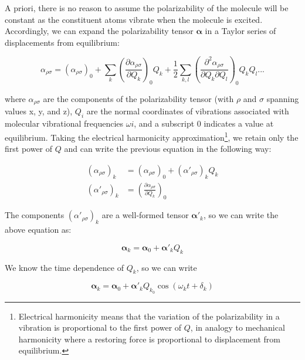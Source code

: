 A priori, there is no reason to assume the polarizability of the molecule will be constant as the constituent atoms vibrate when the molecule is excited. Accordingly, we can expand the polarizability tensor $\boldsymbol{\alpha}$ in a Taylor series of displacements from equilibrium:

\begin{equation}
\alpha_{\rho \sigma} = (\alpha_{\rho \sigma})_{0} + \sum_{k} \left( \frac{\partial \alpha_{\rho \sigma}}{\partial Q_{k}} \right)_{0} Q_{k} + \frac{1}{2} \sum_{k,l} \left( \frac{\partial^{2} \alpha_{\rho \sigma}}{\partial Q_{k} \partial Q_{l}} \right)_{0} Q_{k} Q_{l} ...
\end{equation}

where $\alpha_{\rho \sigma}$ are the components of the polarizability tensor (with $\rho$ and $\sigma$ spanning values x, y, and z), $Q_{i}$ are the normal coordinates of vibrations associated with molecular vibrational frequencies $\omega{i}$, and a subscript 0 indicates a value at equilibrium. Taking the electrical harmonicity approximation\footnote{Electrical harmonicity means that the variation of the polarizability in a vibration is proportional to the first power of $Q$, in analogy to mechanical harmonicity where a restoring force is proportional to displacement from equilibrium.}, we retain only the first power of $Q$ and can write the previous equation in the following way:

\begin{equation}
\begin{aligned}
	(\alpha_{\rho \sigma})_{k} &= (\alpha_{\rho \sigma})_{0} + (\alpha'_{\rho \sigma})_{k} Q_{k} \\
	(\alpha'_{\rho \sigma})_{k} &= \left( \frac{\partial \alpha_{\rho \sigma}}{\partial Q_{k}} \right)_{0}
\end{aligned}
\end{equation}

The components $(\alpha'_{\rho \sigma})_{k}$ are a well-formed tensor $\boldsymbol{\alpha}'_{k}$, so we can write the above equation as:

\begin{equation}
\boldsymbol{\alpha}_{k} = \boldsymbol{\alpha}_{0} + \boldsymbol{\alpha}'_{k} Q_{k}
\end{equation}

We know the time dependence of $Q_{k}$, so we can write

\begin{equation}
\boldsymbol{\alpha}_{k} = \boldsymbol{\alpha}_{0} + \boldsymbol{\alpha}'_{k}Q_{k_{0}} \cos (\omega_{k} t + \delta_{k})
\end{equation}

